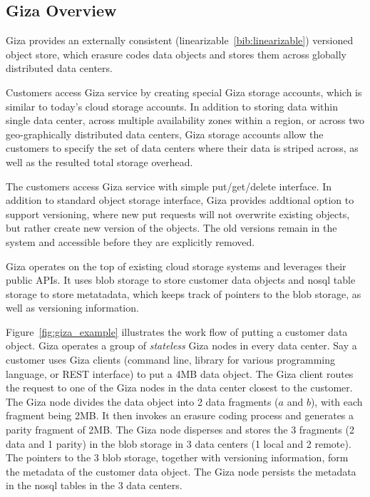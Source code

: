 \subsection{Giza Overview}

Giza provides an externally consistent (linearizable~\ref{bib:linearizable}) versioned object store, which erasure codes data objects and stores them across globally distributed data centers.

Customers access Giza service by creating special Giza storage accounts, which is similar to today's cloud storage accounts. In addition to storing data within single data center, across multiple availability zones within a region, or across two geo-graphically distributed data centers, Giza storage accounts allow the customers to specify the set of data centers where their data is striped across, as well as the resulted total storage overhead.

The customers access Giza service with simple put/get/delete interface. In addition to standard object storage interface, Giza provides addtional option to support versioning, where new put requests will not overwrite existing objects, but rather create new version of the objects. The old versions remain in the system and accessible before they are explicitly removed.

Giza operates on the top of existing cloud storage systems and leverages their public APIs. It uses blob storage to store customer data objects and nosql table storage to store metatadata, which keeps track of pointers to the blob storage, as well as versioning information.

Figure~\ref{fig:giza_example} illustrates the work flow of putting a customer data object. Giza operates a group of {\em stateless} Giza nodes in every data center. Say a customer uses Giza clients (command line, library for various programming language, or REST interface) to put a 4MB data object. The Giza client routes the request to one of the Giza nodes in the data center closest to the customer. The Giza node divides the data object into 2 data fragments ($a$ and $b$), with each fragment being 2MB. It then invokes an erasure coding process and generates a parity fragment of 2MB. The Giza node disperses and stores the 3 fragments (2 data and 1 parity) in the blob storage in 3 data centers (1 local and 2 remote). The pointers to the 3 blob storage, together with versioning information, form the metadata of the customer data object. The Giza node persists the metadata in the nosql tables in the 3 data centers.

